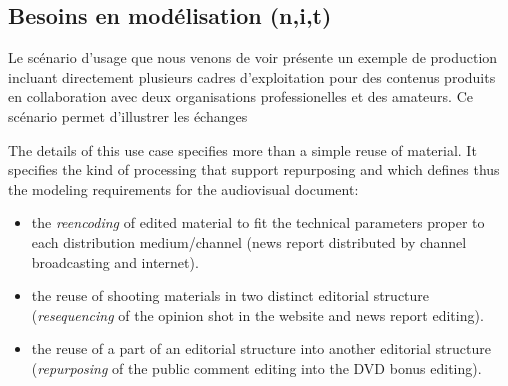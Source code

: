 

\subsection{Besoins en modélisation (n,i,t)}
Le scénario d'usage que nous venons de voir présente un exemple de production incluant directement plusieurs cadres d'exploitation pour des contenus produits en collaboration avec deux organisations professionelles et des amateurs. 
Ce scénario permet d'illustrer les échanges 



The details of this use case specifies more than a simple reuse of material. It specifies the kind of processing that support repurposing and which defines thus the modeling requirements for the audiovisual document:
\begin{itemize}
	\item the \textit{reencoding} of edited material to fit the technical parameters proper to each distribution medium/channel (news report distributed by channel broadcasting and internet).
	
	\item the reuse of shooting materials in two distinct editorial structure (\textit{resequencing} of the opinion shot in the website and news report editing).

	\item the reuse of a part of an editorial structure into another editorial structure (\textit{repurposing} of the public comment editing into the DVD bonus editing). 
\end{itemize}

